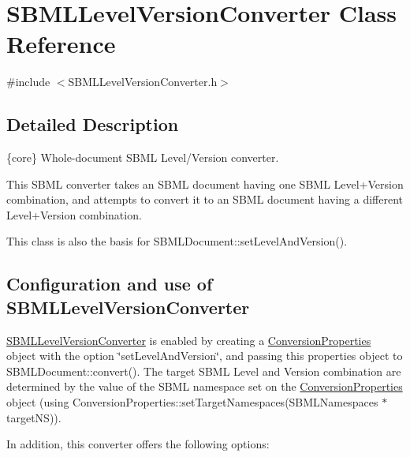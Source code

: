 \hypertarget{class_s_b_m_l_level_version_converter}{}\section{S\+B\+M\+L\+Level\+Version\+Converter Class Reference}
\label{class_s_b_m_l_level_version_converter}


{\ttfamily \#include $<$S\+B\+M\+L\+Level\+Version\+Converter.\+h$>$}



\subsection{Detailed Description}
\{core\} Whole-\/document S\+B\+ML Level/\+Version converter.



This S\+B\+ML converter takes an S\+B\+ML document having one S\+B\+ML Level+\+Version combination, and attempts to convert it to an S\+B\+ML document having a different Level+\+Version combination.

This class is also the basis for S\+B\+M\+L\+Document\+::set\+Level\+And\+Version().\hypertarget{class_s_b_m_l_level_version_converter_SBMLLevelVersionConverter-usage}{}\subsection{Configuration and use of S\+B\+M\+L\+Level\+Version\+Converter}\label{class_s_b_m_l_level_version_converter_SBMLLevelVersionConverter-usage}
\hyperlink{class_s_b_m_l_level_version_converter}{S\+B\+M\+L\+Level\+Version\+Converter} is enabled by creating a \hyperlink{class_conversion_properties}{Conversion\+Properties} object with the option {\ttfamily \char`\"{}set\+Level\+And\+Version\char`\"{}}, and passing this properties object to S\+B\+M\+L\+Document\+::convert(). The target S\+B\+ML Level and Version combination are determined by the value of the S\+B\+ML namespace set on the \hyperlink{class_conversion_properties}{Conversion\+Properties} object (using Conversion\+Properties\+::set\+Target\+Namespaces(\+S\+B\+M\+L\+Namespaces $\ast$target\+N\+S)).

In addition, this converter offers the following options\+:

